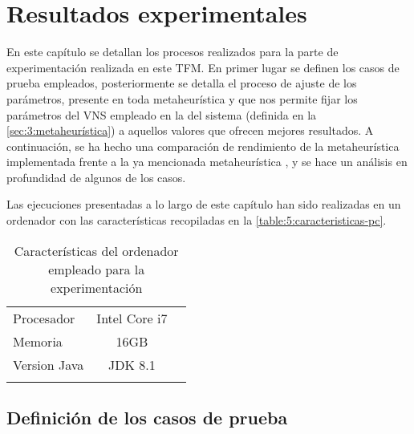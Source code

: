 \graphicspath{{capitulos/Capitulo5-Resultados-experimentales/recursos/}}

\section{Resultados experimentales} \label{capitulo:5}

En este capítulo se detallan los procesos realizados para la parte de experimentación realizada en este TFM. En primer lugar se definen los casos de prueba empleados, posteriormente se detalla el proceso de ajuste de los parámetros, presente en toda metaheurística y que nos permite fijar los parámetros del VNS empleado en la \fasedos{} del sistema (definida en la \autoref{sec:3:metaheurística}) a aquellos valores que ofrecen mejores resultados. A continuación, se ha hecho una comparación de rendimiento de la metaheurística implementada frente a la ya mencionada metaheurística \sa{}, y se hace un análisis en profundidad de algunos de los casos.

Las ejecuciones presentadas a lo largo de este capítulo han sido realizadas en un ordenador con las características recopiladas en la \autoref{table:5:caracteristicas-pc}.

\begin{table}[h]
	\centering
	\caption{Características del ordenador empleado para la experimentación}
	\begin{tabular}{lcc}
		\hline
		Procesador   & Intel Core i7 &  \\
		Memoria      &     16GB      &  \\
		Version Java &    JDK 8.1    &  \\ \hline
		             &               &
	\end{tabular}
\label{table:5:caracteristicas-pc}
\end{table}

\subsection{Definición de los casos de prueba}
\label{sec:5:def-casos}

